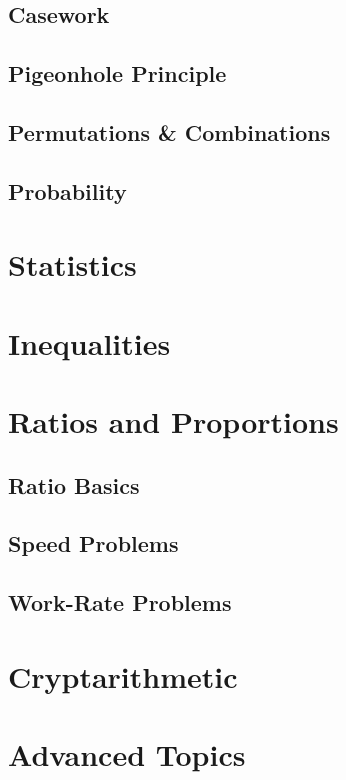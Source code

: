 \subsection{Casework}
\subsection{Pigeonhole Principle}
\subsection{Permutations \& Combinations}
\subsection{Probability}

\section{Statistics}

\section{Inequalities}

\section{Ratios and Proportions}
\subsection{Ratio Basics}
\subsection{Speed Problems}
\subsection{Work-Rate Problems}

\section{Cryptarithmetic}

\section{Advanced Topics}



